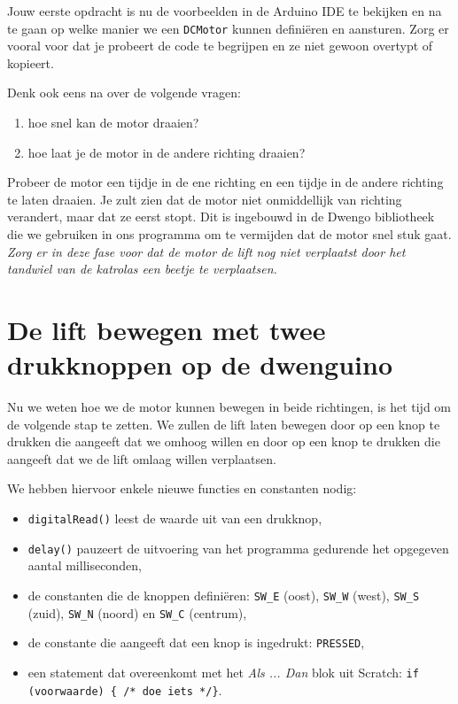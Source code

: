 \documentclass[a4paper, 10pt]{article}
\begin{document}
Jouw eerste opdracht is nu de voorbeelden in de Arduino IDE te bekijken en na te gaan op welke manier we een
\texttt{DCMotor} kunnen defini\"eren en aansturen. Zorg er vooral voor dat je probeert de code te begrijpen en ze
niet gewoon overtypt of kopieert.

Denk ook eens na over de volgende vragen:

\begin{enumerate}
\item hoe snel kan de motor draaien?
\item hoe laat je de motor in de andere richting draaien?
\end{enumerate}

Probeer de motor een tijdje in de ene richting en een tijdje in de andere richting te laten draaien. Je zult zien dat
de motor niet onmiddellijk van richting verandert, maar dat ze eerst stopt. Dit is ingebouwd in de Dwengo bibliotheek
die we gebruiken in ons programma om te vermijden dat de motor snel stuk gaat. {\em Zorg er in deze fase voor dat de motor de
lift nog niet verplaatst door het tandwiel van de katrolas een beetje te verplaatsen.}

\section{De lift bewegen met twee drukknoppen op de dwenguino}

Nu we weten hoe we de motor kunnen bewegen in beide richtingen, is het tijd om de volgende stap te zetten. We zullen
de lift laten bewegen door op een knop te drukken die aangeeft dat we omhoog willen en door op een knop te drukken
die aangeeft dat we de lift omlaag willen verplaatsen.

We hebben hiervoor enkele nieuwe functies en constanten nodig:

\begin{itemize}
\item \texttt{digitalRead()} leest de waarde uit van een drukknop,
\item \texttt{delay()} pauzeert de uitvoering van het programma gedurende het opgegeven aantal milliseconden,
\item de constanten die de knoppen defini\"eren: \texttt{SW\_E} (oost), \texttt{SW\_W} (west), \texttt{SW\_S} (zuid), \texttt{SW\_N} (noord) en \texttt{SW\_C} (centrum),
\item de constante die aangeeft dat een knop is ingedrukt: \texttt{PRESSED},
\item een statement dat overeenkomt met het {\em Als ... Dan} blok uit Scratch: \texttt{if (voorwaarde) \{ /* doe iets */\}}.
\end{itemize}
\end{document}
